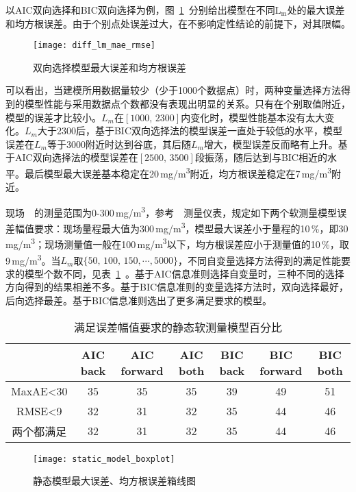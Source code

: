 以AIC双向选择和BIC双向选择为例，图~\ref{fig:diff_lm_mae_rmse}~分别给出模型在不同$\textrm{L}_{\textrm{m}}$处的最大误差和均方根误差。由于个别点处误差过大，在不影响定性结论的前提下，对其限幅。
\begin{figure}[!hbt]
\centering
\texttt{[image: diff\_lm\_mae\_rmse]}
\caption{双向选择模型最大误差和均方根误差} \label{fig:diff_lm_mae_rmse}
\end{figure}

可以看出，当建模所用数据量较少（少于1000个数据点）时，两种变量选择方法得到的模型性能与采用数据点个数都没有表现出明显的关系。只有在个别取值附近，模型的误差才比较小。$L_{m}$在$[\textrm{1000},\,\textrm{2300}]$内变化时，模型性能基本没有太大变化。$L_{m}$大于2300后，基于BIC双向选择法的模型误差一直处于较低的水平，模型误差在$L_{m}$等于3000附近时达到谷底，其后随${L}_{m}$增大，模型误差反而略有上升。基于AIC双向选择法的模型误差在$[\textrm{2500},\,\textrm{3500}]$段振荡，随后达到与BIC相近的水平。最后模型最大误差基本稳定在20$\,$\si{mg/m^3}附近，均方根误差稳定在7$\,$\si{mg/m^3}附近。

现场~~的测量范围为0-300$\,$\si{mg/m^3}，参考~~测量仪表，规定如下两个软测量模型误差幅值要求：现场量程最大值为300$\,$\si{mg/m^3}，模型最大误差小于量程的10$\,$\si{\percent}，即30$\,$\si{mg/m^3}；现场测量值一般在100$\,$\si{mg/m^3}以下，均方根误差应小于测量值的10$\,$\si{\percent}，取9$\,$\si{mg/m^3}。当$L_{m}$取$\{\textrm{50},\,\textrm{100},\,\textrm{150},\cdots,\textrm{5000}\}$，不同自变量选择方法得到的满足性能要求的模型个数不同，见表~\ref{tab:static_model_percent}~。基于AIC信息准则选择自变量时，三种不同的选择方向得到的结果相差不多。基于BIC信息准则的变量选择方法时，双向选择最好，后向选择最差。基于BIC信息准则选出了更多满足要求的模型。
\begingroup
\renewcommand*{\arraystretch}{1.67}
\begin{table}[!h]
\small
\centering
\caption[满足误差幅值要求的静态软测量模型百分比]{满足误差幅值要求的静态软测量模型百分比} \label{tab:static_model_percent}
\begin{tabular}{ccccccc}
\hline\hline 
	&AIC back	&AIC forward	&AIC both	&BIC back	&BIC forward	&BIC both\\
\hline
MaxAE<30	&35	&35	&35	&39	&49	&51\\
RMSE<9	&32	&31	&32	&35	&44	&46\\
两个都满足	&32	&31	&32	&35	&44	&46\\
\hline\hline
\end{tabular}
\end{table}
\endgroup

\begin{figure}[!hbt]
\centering
\texttt{[image: static\_model\_boxplot]}
\caption{静态模型最大误差、均方根误差箱线图} \label{fig:static_model_boxplot}
\end{figure}

